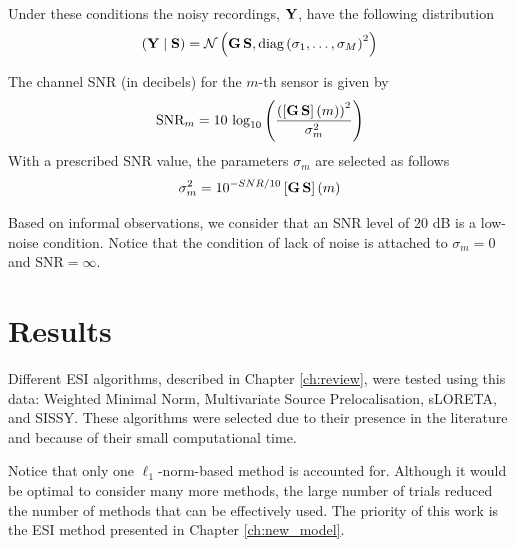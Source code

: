 %
Under these conditions the noisy recordings, $\mathbf{Y}$, have the following distribution
\begin{equation}
\left( \mathbf{Y} \;\middle|\; \mathbf{S} \right) =
\mathcal{N}\left(  \mathbf{G}\, \mathbf{S}, \text{diag}\left(  \sigma_1, \dots, \sigma_M  \right)^2  \right)
\end{equation}

The channel SNR (in decibels) for the $m$-th sensor is given by
\begin{equation}
\text{SNR}_m = 
10\, \log_{10}\left(  \frac{ \left(  \left[ \mathbf{G}\, \mathbf{S} \right](m) \right)^2 }{\sigma_m^2}  \right)
\end{equation}
With a prescribed SNR value, the parameters $\sigma_m$ are selected as follows
\begin{equation}
\sigma_m^2 = 
10^{{-{SNR}/{10}} }
\left[ \mathbf{G}\, \mathbf{S} \right](m)
\end{equation}

Based on informal observations, we consider that an SNR level of 20 dB is a low-noise condition.
%
Notice that the condition of lack of noise is attached to $\sigma_m = 0$ and $\text{SNR} = \infty$.


\section{Results}

Different ESI algorithms, described in Chapter \ref{ch:review}, were tested using this data: Weighted Minimal Norm, Multivariate Source Prelocalisation, sLORETA, and SISSY.
%
These algorithms were selected due to their presence in the literature and because of their small computational time.

Notice that only one $\ell_1$-norm-based method is accounted for.
%
Although it would be optimal to consider many more methods, the large number of trials reduced the number of methods that can be effectively used.
%
The priority of this work is the ESI method presented in Chapter \ref{ch:new_model}.

